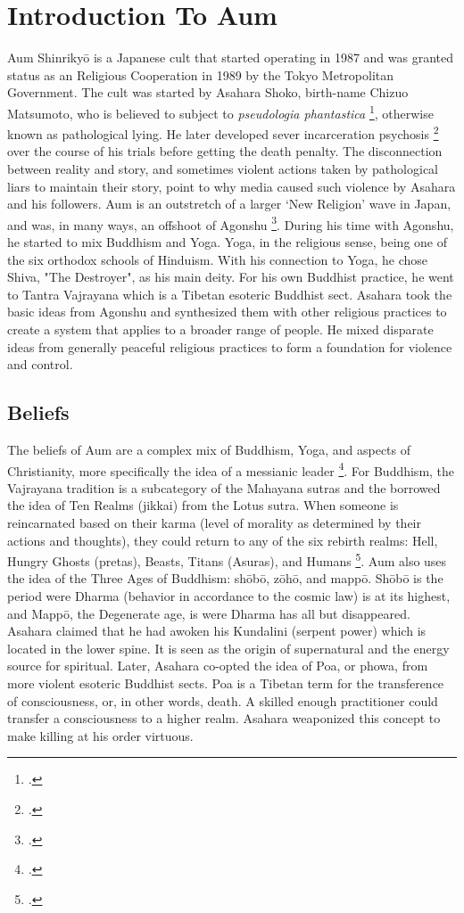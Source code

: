 \documentclass[12pt, letterpaper]{article}
\newcommand{\sorta}[1]{`#1'}
\begin{document}
\section{Introduction To Aum}
Aum Shinriky\=o is a Japanese cult that started operating in 1987 and was granted status as an Religious
Cooperation in 1989 by the Tokyo Metropolitan Government. The cult was started by Asahara Shoko, birth-name
Chizuo Matsumoto, who is believed to subject to \textit{pseudologia phantastica}
\footcite[5]{olson_aum_1999}, otherwise known as pathological lying. He later developed sever
incarceration psychosis \footcite[6]{olson_aum_1999} over the course of his trials before getting
the death penalty. The disconnection between reality and story, and sometimes violent actions taken by
pathological liars to maintain their story, point to why media caused such violence by Asahara and his
followers. Aum is an outstretch of a larger \sorta{New Religion} wave in Japan, and was, in many
ways, an offshoot of Agonshu \footcite[82,83]{watanabe_religion_1998}. During his time with Agonshu, he
started to mix Buddhism and Yoga. Yoga, in the religious sense, being one of the six orthodox schools of 
Hinduism. With his connection to Yoga, he chose Shiva, "The Destroyer", as his main deity. For his own Buddhist
practice, he went to Tantra Vajrayana which is a Tibetan esoteric Buddhist sect. Asahara took the basic ideas from
Agonshu and synthesized them with other religious practices to create a system that applies to a broader 
range of people. He mixed disparate ideas from generally peaceful religious practices to form a foundation 
for violence and control.

\subsection{Beliefs}
The beliefs of Aum are a complex mix of Buddhism, Yoga, and aspects of Christianity, more specifically the
idea of a messianic leader \footcite[1144]{metraux_religious_1995}. For Buddhism, the Vajrayana tradition is 
a subcategory of the Mahayana sutras and the borrowed the idea of Ten Realms (jikkai) from the Lotus sutra.
When someone is reincarnated based on their karma (level of morality as determined by their actions and
thoughts), they could return to any of the six rebirth realms:  Hell, Hungry Ghosts (pretas), Beasts, Titans
(Asuras), and Humans \footcite[83]{watanabe_religion_1998}. Aum also uses the idea of the Three Ages 
of Buddhism: sh\=ob\=o, z\=oh\=o, and mapp\=o. Sh\=ob\=o is the period were Dharma (behavior in accordance
to the cosmic law) is at its highest, and Mapp\=o, the Degenerate age, is were Dharma has all but 
disappeared. Asahara claimed that he had awoken his Kundalini (serpent power) which is located in the lower
spine. It is seen as the origin of supernatural and the energy source for spiritual. Later, Asahara co-opted
the idea of Poa, or phowa, from more violent esoteric Buddhist sects. Poa is a Tibetan term for the 
transference of consciousness, or, in other words, death. A skilled enough practitioner could transfer a 
consciousness to a higher realm. Asahara weaponized this concept to make killing at his order virtuous.
\end{document}
